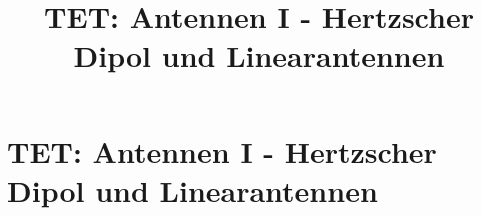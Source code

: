 
\usepackage{tikz-3dplot}
\usetikzlibrary{shapes.geometric}
\newcommand{\Tube}[6][]%
{   \colorlet{InColor}{#4}
    \colorlet{OutColor}{#5}
    \foreach \I in {1,...,#3}
    {   \pgfmathsetlengthmacro{\h}{(\I-1)/#3*#2}
        \pgfmathsetlengthmacro{\r}{sqrt(pow(#2,2)-pow(\h,2))}
        \pgfmathsetmacro{\c}{(\I-0.5)/#3*100}
        \draw[InColor!\c!OutColor, line width=\r, #1] #6;
    }
}

\title[TET: Antennen I - Hertzscher Dipol und Linearantennen]{TET: Antennen I - Hertzscher Dipol und Linearantennen}


% 
% 

\maketitle

% 
% 
\section{TET: Antennen I - Hertzscher Dipol und Linearantennen}

